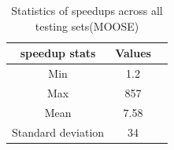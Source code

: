 \begin{table}
\centering
\caption{Statistics of speedups across all testing sets(MOOSE)}
\label{Statistics of speedups across all testing sets(MOOSE)}
\begin{tabular}{|c|c|c|}    \hline  

speedup stats                                 & Values\\ \hline\hline
Min                         & 1.2 \\ \hline
Max                                       & 857  \\ \hline
Mean                                       & 7.58  \\ \hline
Standard deviation                                          & 34\\ \hline

\end{tabular}
\end{table}